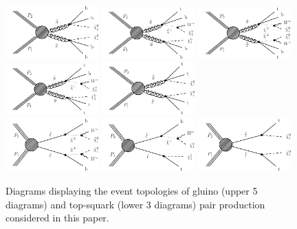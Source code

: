 \begin{figure}[thb!]
\centering
\includegraphics[width=0.32\textwidth]{figs/analysis8TeV/T1bbbb.pdf}
\includegraphics[width=0.32\textwidth]{figs/analysis8TeV/T1tbbb.pdf}
\includegraphics[width=0.32\textwidth]{figs/analysis8TeV/T1ttbb.pdf} \\
\includegraphics[width=0.32\textwidth]{figs/analysis8TeV/T1tttb.pdf}
\includegraphics[width=0.32\textwidth]{figs/analysis8TeV/T1tttt.pdf} \\
\includegraphics[width=0.32\textwidth]{figs/analysis8TeV/T2bw.pdf}
\includegraphics[width=0.32\textwidth]{figs/analysis8TeV/T2tb.pdf}
\includegraphics[width=0.32\textwidth]{figs/analysis8TeV/T2tt.pdf}
\caption{Diagrams displaying the event topologies of gluino (upper 5
  diagrams) and top-squark (lower 3 diagrams) pair production
  considered in this paper.\label{fig:SMSGluinoTopology}}
\end{figure}



